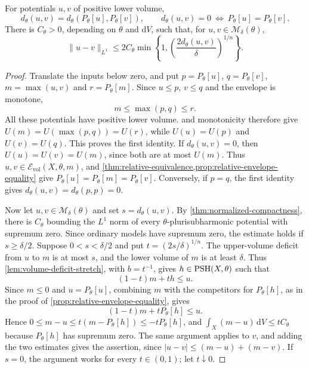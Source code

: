 \begin{proposition}\label{prop:model-volume-separation}
For potentials $u,v$ of positive lower volume,
\[
 d_\theta(u,v)=d_\theta(P_\theta[u],P_\theta[v]),\qquad
 d_\theta(u,v)=0\ \Longleftrightarrow\ P_\theta[u]=P_\theta[v].
\]
There is $C_\theta>0$, depending on $\theta$ and $\mathrm{d}V$, such that, for $u,v\in\mathcal M_\delta(\theta)$,
\[
 \|u-v\|_{L^1}\leq
 2C_\theta\min\left\{1,
       \left(\frac{2d_\theta(u,v)}\delta\right)^{1/n}\right\}.
\]
\end{proposition}
\begin{proof}
Translate the inputs below zero, and put $p=P_\theta[u]$, $q=P_\theta[v]$, $m=\max(u,v)$ and $r=P_\theta[m]$. Since $u\leq p$, $v\leq q$ and the envelope is monotone,
\[
 m\leq\max(p,q)\leq r.
\]
All these potentials have positive lower volume.  and monotonicity therefore give $U(m)=U(\max(p,q))=U(r)$, while $U(u)=U(p)$ and $U(v)=U(q)$. This proves the first identity. If $d_\theta(u,v)=0$, then $U(u)=U(v)=U(m)$, since both are at most $U(m)$. Thus $u,v\in\mathcal E_{\mathrm{vol}}(X,\theta,m)$, and \cref{thm:relative-equivalence,prop:relative-envelope-equality} give $P_\theta[u]=P_\theta[m]=P_\theta[v]$. Conversely, if $p=q$, the first identity gives $d_\theta(u,v)=d_\theta(p,p)=0$.

Now let $u,v\in\mathcal M_\delta(\theta)$ and set $s=d_\theta(u,v)$. By \cref{thm:normalized-compactness}, there is $C_\theta$ bounding the $L^1$ norm of every $\theta$-plurisubharmonic potential with supremum zero. Since ordinary models have supremum zero, the estimate holds if $s\geq\delta/2$. Suppose $0<s<\delta/2$ and put $t=(2s/\delta)^{1/n}$. The upper-volume deficit from $u$ to $m$ is at most $s$, and the lower volume of $m$ is at least $\delta$. Thus \cref{lem:volume-deficit-stretch}, with $b=t^{-1}$, gives $h\in\mathrm{PSH}(X,\theta)$ such that
\[
 (1-t)m+th\leq u.
\]
Since $m\leq0$ and $u=P_\theta[u]$, combining $m$ with the competitors for $P_\theta[h]$, as in the proof of \cref{prop:relative-envelope-equality}, gives
\[
 (1-t)m+tP_\theta[h]\leq u.
\]
Hence $0\leq m-u\leq t(m-P_\theta[h])\leq-tP_\theta[h]$, and $\int_X(m-u)\,\mathrm{d}V\leq tC_\theta$ because $P_\theta[h]$ has supremum zero. The same argument applies to $v$, and adding the two estimates gives the assertion, since $|u-v|\leq(m-u)+(m-v)$. If $s=0$, the argument works for every $t\in(0,1)$; let $t\downarrow0$.
\end{proof}

